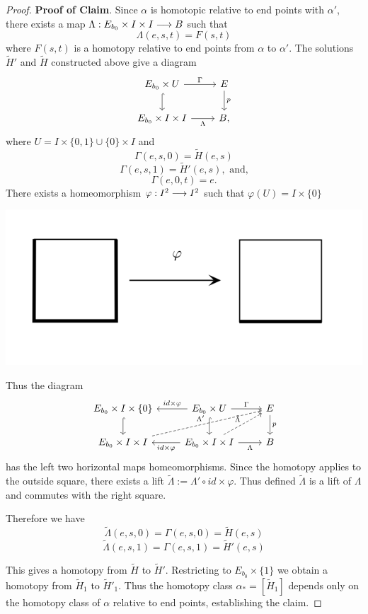 \documentclass[11pt]{book} %
\begin{document}
\begin{proof}
\textbf{Proof of Claim}. Since $\alpha$ is homotopic relative to end points with $\alpha'$, there exists a map $\Lambda: E_{b_0}\times I\times I\longrightarrow B$ such that
$$
\Lambda(e,s,t)=F(s,t)
$$
where $F(s,t)$ is a homotopy relative to end points from $\alpha$ to $\alpha'$. The solutions $\tilde{H}'$ and $\tilde{H}$ constructed above give a diagram
$$
\begin{tikzcd}
E_{b_0}\times U \arrow[r, "\Gamma"] \arrow[d, hook] & E \arrow[d, "p"] \\
E_{b_0}\times I\times I \arrow[r, "\Lambda"'] & B,
\end{tikzcd}
$$
where $U=I\times \{0,1\}\cup \{0\}\times I$ and
$$
\Gamma(e,s,0)=\tilde{H}(e,s)
$$
$$
\Gamma(e,s,1)=\tilde{H}'(e,s), \text{ and,}
$$
$$
\Gamma(e,0,t)=e.
$$
There exists a homeomorphism $\varphi: I^2\longrightarrow I^2$ such that $\varphi(U)=I\times \{0\}$
\begin{center}
\includegraphics[scale=0.5]{varp}
\end{center}
Thus the diagram 
$$
\begin{tikzcd}
E_{b_0}\times I\times\{0\} \arrow[d, hook] & E_{b_0}\times U \arrow[r, "\Gamma"] \arrow[d, hook] \arrow[l, "id\times \varphi"'] & E \arrow[d, "p"] \\
E_{b_0}\times I\times I \arrow[rru, "\Lambda'", dashed] & E_{b_0}\times I\times I \arrow[r, "\Lambda"'] \arrow[l, "id\times \varphi"] \arrow[ru, "\tilde{\Lambda}", dashed] & B
\end{tikzcd}
$$
has the left two horizontal maps homeomorphisms. Since the homotopy applies to the outside square, there exists a lift $\tilde{\Lambda}:=\Lambda'\circ id\times\varphi$. Thus defined $\tilde{\Lambda}$ is a lift of $\Lambda$ and commutes with the right square.

Therefore we have
$$
\tilde{\Lambda}(e,s,0)=\Gamma(e,s,0)=\tilde{H}(e,s)
$$
$$
\tilde{\Lambda}(e,s,1)=\Gamma(e,s,1)=\tilde{H}'(e,s)
$$

This gives a homotopy from $\tilde{H}$ to $\tilde{H}'$. Restricting to $E_{b_0}\times \{1\}$ we obtain a homotopy from $\tilde{H}_1$ to $\tilde{H}'_1$. Thus the homotopy class $\alpha_*=[\tilde{H}_1]$ depends only on the homotopy class of $\alpha$ relative to end points, establishing the claim. 


\end{proof}
\end{document}

